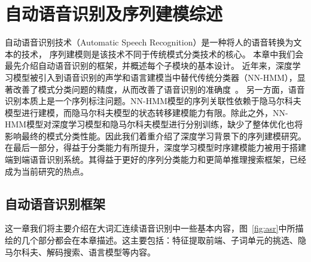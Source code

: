 
\chapter{自动语音识别及序列建模综述}
\label{chap:intro}

自动语音识别技术（Automatic Speech Recognition）是一种将人的语音转换为文本的技术，
序列建模则是该技术不同于传统模式分类技术的核心。
%
本章中我们会最先介绍自动语音识别的框架，并概述每个子模块的基本设计。
近年来，深度学习模型被引入到语音识别的声学和语言建模当中替代传统分类器（NN-HMM），显著改善了模式分类问题的精度，从而改善了语音识别的准确度~\cite{CD-DNN-HMM-dahl2012,DNN4ASR-hinton2012}。 另一方面，语音识别本质上是一个序列标注问题。NN-HMM模型的序列关联性依赖于隐马尔科夫模型进行建模，而隐马尔科夫模型的状态转移建模能力有限。除此之外，NN-HMM模型对深度学习模型和隐马尔科夫模型进行分别训练，缺少了整体优化也将影响最终的模式分类性能。因此我们着重介绍了深度学习背景下的序列建模研究。
在最后一部分，得益于分类能力有所提升，深度学习模型时序建模能力被用于搭建端到端语音识别系统。其得益于更好的序列分类能力和更简单推理搜索框架，已经成为当前研究的热点。


\section{自动语音识别框架}
\label{chap:intro-asr}

这一章我们将主要介绍在大词汇连续语音识别中一些基本内容，图~\ref{fig:asr}中所描绘的几个部分都会在本章描述。这主要包括：特征提取前端、子词单元的挑选、隐马尔科夫、解码搜索、语言模型等内容。

